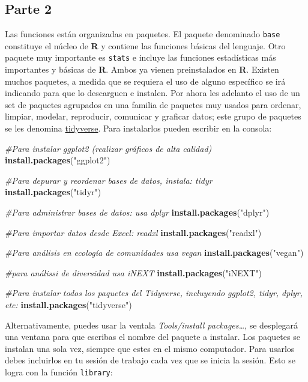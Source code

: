 \documentclass[]{article}
\newenvironment{Shaded}{\begin{snugshade}}{\end{snugshade}}
\newcommand{\CommentTok}[1]{\textcolor[rgb]{0.56,0.35,0.01}{\textit{#1}}}
\newcommand{\KeywordTok}[1]{\textcolor[rgb]{0.13,0.29,0.53}{\textbf{#1}}}
\newcommand{\NormalTok}[1]{#1}
\newcommand{\StringTok}[1]{\textcolor[rgb]{0.31,0.60,0.02}{#1}}
\begin{document}
\hypertarget{parte-2}{%
\subsection{Parte 2}\label{parte-2}}

Las funciones están organizadas en paquetes. El paquete denominado
\texttt{base} constituye el núcleo de \textbf{R} y contiene las
funciones básicas del lenguaje. Otro paquete muy importante es
\texttt{stats} e incluye las funciones estadísticas más importantes y
básicas de \textbf{R}. Ambos ya vienen preinstalados en \textbf{R}.
Existen muchos paquetes, a medida que se requiera el uso de alguno
específico se irá indicando para que lo descarguen e instalen. Por ahora
les adelanto el uso de un set de paquetes agrupados en una familia de
paquetes muy usados para ordenar, limpiar, modelar, reproducir,
comunicar y graficar datos; este grupo de paquetes se les denomina
\href{https://www.tidyverse.org/}{tidyverse}. Para instalarlos pueden
escribir en la consola:

\begin{Shaded}
\begin{Highlighting}[]
\CommentTok{#Para instalar ggplot2 (realizar gráficos de alta calidad)}
\KeywordTok{install.packages}\NormalTok{(}\StringTok{"ggplot2"}\NormalTok{)}

\CommentTok{#Para depurar y reordenar bases de datos, instala: tidyr}
\KeywordTok{install.packages}\NormalTok{(}\StringTok{"tidyr"}\NormalTok{)}

\CommentTok{#Para administrar bases de datos: usa dplyr}
\KeywordTok{install.packages}\NormalTok{(}\StringTok{"dplyr"}\NormalTok{)}

\CommentTok{#Para importar datos desde Excel: readxl}
\KeywordTok{install.packages}\NormalTok{(}\StringTok{"readxl"}\NormalTok{)}

\CommentTok{#Para análisis en ecología de comunidades usa vegan}
\KeywordTok{install.packages}\NormalTok{(}\StringTok{"vegan"}\NormalTok{)}

\CommentTok{#para análissi de diversidad usa iNEXT}
\KeywordTok{install.packages}\NormalTok{(}\StringTok{"iNEXT"}\NormalTok{)}

\CommentTok{#Para instalar todos los paquetes del Tidyverse, incluyendo ggplot2, tidyr, dplyr, etc:}
\KeywordTok{install.packages}\NormalTok{(}\StringTok{"tidyverse"}\NormalTok{)}
\end{Highlighting}
\end{Shaded}

Alternativamente, puedes usar la ventala \emph{Tools/install
packages\ldots{}}, se desplegará una ventana para que escribas el nombre
del paquete a instalar. Los paquetes se instalan una sola vez, siempre
que estes en el mismo computador. Para usarlos debes incluirlos en tu
sesión de trabajo cada vez que se inicia la sesión. Esto se logra con la
función \texttt{library}:
\end{document}
